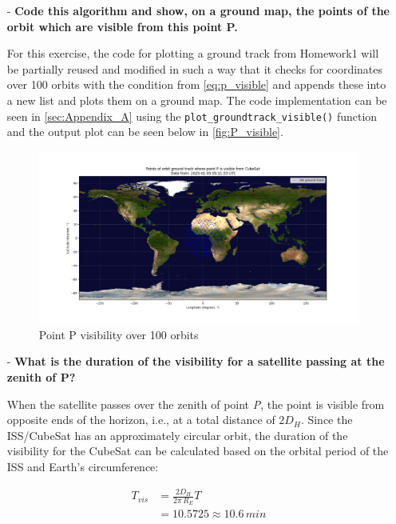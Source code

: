\begin{itemize}
    \newpage
    \item[-] \textbf{Code this algorithm and show, on a ground map, the points of the orbit which are visible from this point P.}

    For this exercise, the code for plotting a ground track from Homework1 will be partially reused and modified in such a way that it checks for coordinates over 100 orbits with the condition from \autoref{eq:p_visible} and appends these into a new list and plots them on a ground map.
    The code implementation can be seen in \autoref{sec:Appendix_A} using the \verb|plot_groundtrack_visible()| function and the output plot can be seen below in \autoref{fig:P_visible}.
    
    \begin{figure}[h]
        \centering
        \includegraphics[width=\linewidth]{Doc/Graphics/P_visible_groundtrack.png}
        \caption{Point P visibility over 100 orbits}
        \label{fig:P_visible}
    \end{figure}


    
    \item[-] \textbf{What is the duration of the visibility for a satellite passing at the zenith of P?}

    When the satellite passes over the zenith of point \textit{P}, the point is visible from opposite ends of the horizon, i.e., at a total distance of $2D_H$.
    Since the ISS/CubeSat has an approximately circular orbit, the duration of the visibility for the CubeSat can be calculated based on the orbital period of the ISS and Earth's circumference:

    \begin{equation}
        \label{eq:visibility_duration}
        \begin{split}
            T_{vis} &= \frac{2 D_H}{2 \pi \, R_E} T \\
            &= 10.5725 \approx 10.6\,min
        \end{split}
    \end{equation}


\end{itemize}
